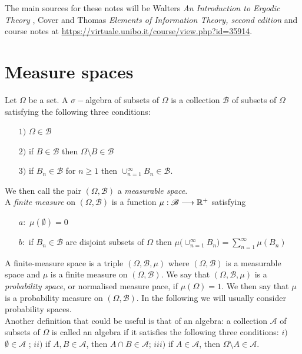 The main sources for these notes will be Walters \textit{An Introduction to Ergodic Theory} \cite{Walters}, Cover and Thomas \textit{Elements of Information Theory, second edition} \cite{Cover_and_Thomas} and course notes at \url{https://virtuale.unibo.it/course/view.php?id=35914}.

\section{Measure spaces}
\label{par:measure_spaces}
Let $\Omega$ be a set. A $\sigma-$algebra of subsets of $\Omega$ is a collection $\mathscr{B}$ of subsets of $\Omega$ satisfying the following three conditions:
\begin{itemize}
    \item[$1)$] $\Omega \in \mathscr{B}$
    \item[$2)$] if $B \in \mathscr{B}$ then $\Omega \setminus B \in \mathscr{B}$
    \item[$3)$] if $B_n \in \mathscr{B}$ for $n \geq 1$ then $\cup_{n=1}^{\infty} B_n \in \mathscr{B}$.
\end{itemize}
We then call the pair $(\Omega, \mathscr{B})$ a \textit{measurable space}.
\\A \textit{finite measure} on $(\Omega, \mathscr{B})$ is a function $\mu: \mathscr{B} \longrightarrow \mathbb{R}^+$ satisfying 
\begin{itemize}
    \item[$a:$] $\mu(\emptyset) = 0$
    \item[$b:$] if $B_n \in \mathscr{B}$ are disjoint subsets of $\Omega$ then $\mu \big(\cup_{n=1}^{\infty} B_n\big) = \sum_{n=1}^{\infty} \mu(B_n)$
\end{itemize}
A finite-measure space is a triple $(\Omega, \mathscr{B}, \mu)$ where $(\Omega, \mathscr{B})$ is a measurable space and $\mu$ is a finite measure on $(\Omega, \mathscr{B})$. We say that $(\Omega, \mathscr{B}, \mu)$ is a \textit{probability space}, or normalised measure pace, if $\mu(\Omega) = 1$. We then say that $\mu$ is a probability measure on $(\Omega, \mathscr{B})$. In the following we will usually consider probability spaces. 
\\Another definition that could be useful is that of an algebra:
a collection $\mathscr{A}$ of subsets of $\Omega$ is called an algebra if it satisfies the following three conditions: $i)$ $\emptyset \in \mathscr{A}$ ; $ii)$ if $A, B \in \mathscr{A}$, then $A \cap B \in \mathscr{A}$; $iii)$ if $A \in \mathscr{A}$, then $\Omega \setminus A \in \mathscr{A}$. 

